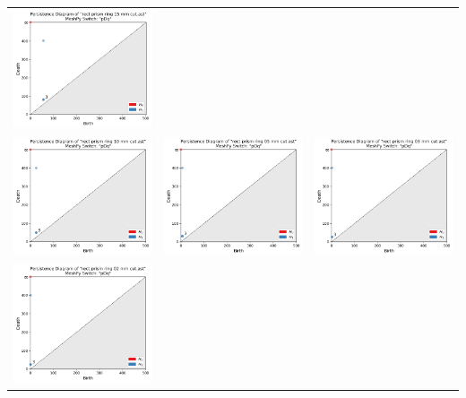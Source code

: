 \documentclass[ma]{uncgdissertationexp}
\theoremstyle{plain}
\theoremstyle{definition}
\theoremstyle{remark}
\begin{document}
\begin{table}[H]
\begin{center}
\begin{tabular}{ccc}
         \includegraphics[width=2in]{Final Run, (rect prism ring 15 mm cut) persdia.png} \\
         \includegraphics[width=2in]{Final Run, (rect prism ring 10 mm cut) persdia.png} & 
         \includegraphics[width=2in]{Final Run, (rect prism ring 05 mm cut) persdia.png} & 
         \includegraphics[width=2in]{Final Run, (rect prism ring 03 mm cut) persdia.png} \\
         \includegraphics[width=2in]{Final Run, (rect prism ring 02 mm cut) persdia.png} &

\end{tabular}
\end{center}
\end{table}
\end{document}
